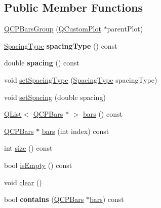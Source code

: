 \subsection*{Public Member Functions}
\begin{DoxyCompactItemize}
\item 
\hyperlink{class_q_c_p_bars_group_aa4e043b9a22c6c5ea0f93740aca063e1}{Q\+C\+P\+Bars\+Group} (\hyperlink{class_q_custom_plot}{Q\+Custom\+Plot} $\ast$parent\+Plot)
\item 
\hyperlink{class_q_c_p_bars_group_a4c0521120a97e60bbca37677a37075b6}{Spacing\+Type} {\bfseries spacing\+Type} () const \hypertarget{class_q_c_p_bars_group_a1bb562f669d47bd7d3cdd2da1f7d8f00}{}\label{class_q_c_p_bars_group_a1bb562f669d47bd7d3cdd2da1f7d8f00}

\item 
double {\bfseries spacing} () const \hypertarget{class_q_c_p_bars_group_a730bffefcac6c97aaf60e6f64dd3bcd9}{}\label{class_q_c_p_bars_group_a730bffefcac6c97aaf60e6f64dd3bcd9}

\item 
void \hyperlink{class_q_c_p_bars_group_a2c7e2d61b10594a4555b615e1fcaf49e}{set\+Spacing\+Type} (\hyperlink{class_q_c_p_bars_group_a4c0521120a97e60bbca37677a37075b6}{Spacing\+Type} spacing\+Type)
\item 
void \hyperlink{class_q_c_p_bars_group_aa553d327479d72a0c3dafcc724a190e2}{set\+Spacing} (double spacing)
\item 
\hyperlink{class_q_list}{Q\+List}$<$ \hyperlink{class_q_c_p_bars}{Q\+C\+P\+Bars} $\ast$ $>$ \hyperlink{class_q_c_p_bars_group_a7c72ed1f8cd962c93b8c42ab96cd91ec}{bars} () const 
\item 
\hyperlink{class_q_c_p_bars}{Q\+C\+P\+Bars} $\ast$ \hyperlink{class_q_c_p_bars_group_a72d022790b7c93151c95c28eefaf51b4}{bars} (int index) const 
\item 
int \hyperlink{class_q_c_p_bars_group_af07364189c5717a158ec95b609687532}{size} () const 
\item 
bool \hyperlink{class_q_c_p_bars_group_a1d89da4e9176f4f77105e9a4afd44e2b}{is\+Empty} () const 
\item 
void \hyperlink{class_q_c_p_bars_group_a3ddf23928c6cd89530bd34ab7ba7b177}{clear} ()
\item 
bool {\bfseries contains} (\hyperlink{class_q_c_p_bars}{Q\+C\+P\+Bars} $\ast$\hyperlink{class_q_c_p_bars_group_a7c72ed1f8cd962c93b8c42ab96cd91ec}{bars}) const \hypertarget{class_q_c_p_bars_group_adb4837894167e629e42e200db056fac3}{}\label{class_q_c_p_bars_group_adb4837894167e629e42e200db056fac3}


\end{DoxyCompactItemize}
